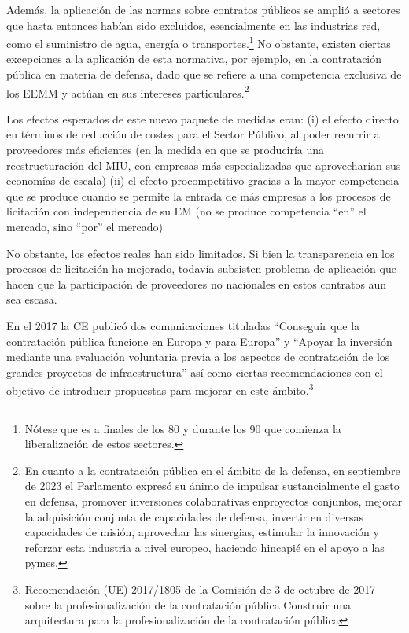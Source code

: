 \documentclass[10pt,a4paper]{article}
\begin{document}
Además, la aplicación de las normas sobre contratos públicos se amplió a sectores que hasta entonces habían sido excluidos, esencialmente en las industrias red, como el suministro de agua, energía o transportes.\footnote{%
    Nótese que es a finales de los 80 y durante los 90 que comienza la liberalización de estos sectores.
} No obstante, existen ciertas excepciones a la aplicación de esta normativa, por ejemplo, en la contratación pública en materia de defensa, dado que se refiere a una competencia exclusiva de los EEMM y actúan en sus intereses particulares.\footnote{%
    En cuanto a la contratación pública en el ámbito de la defensa, en septiembre de 2023 el Parlamento expresó su ánimo de impulsar sustancialmente el gasto en defensa, promover inversiones colaborativas enproyectos conjuntos, mejorar la adquisición conjunta de capacidades de defensa, invertir en diversas capacidades de misión, aprovechar las sinergias, estimular la innovación y reforzar esta industria a nivel europeo, haciendo hincapié en el apoyo a las pymes.
} 

Los efectos esperados de este nuevo paquete de medidas eran:
(i) el efecto directo en términos de reducción de costes para el Sector Público, al poder recurrir a proveedores más eficientes (en la medida en que se produciría una reestructuración del MIU, con empresas más especializadas que aprovecharían sus economías de escala)
(ii) el efecto procompetitivo gracias a la mayor competencia que se produce cuando se permite la entrada de más empresas a los procesos de licitación con independencia de su EM (no se produce competencia “en” el mercado, sino “por” el mercado)

No obstante, los efectos reales han sido limitados. Si bien la transparencia en los procesos de licitación ha mejorado, todavía subsisten problema de aplicación que hacen que la participación de proveedores no nacionales en estos contratos aun sea escasa.

En el 2017 la CE publicó dos comunicaciones tituladas “Conseguir que la contratación pública funcione en Europa y para Europa” y “Apoyar la inversión mediante una evaluación voluntaria previa a los aspectos de contratación de los grandes proyectos de infraestructura” así como ciertas recomendaciones con el objetivo de introducir propuestas para mejorar en este ámbito.\footnote{%
    Recomendación (UE) 2017/1805 de la Comisión de 3 de octubre de 2017 sobre la profesionalización de la contratación pública Construir una arquitectura para la profesionalización de la contratación pública
}
\end{document}
